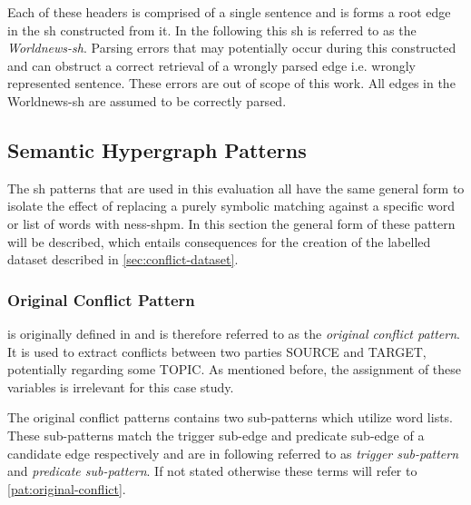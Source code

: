 \documentclass[11pt]{scrreprt}
\let\citef\cite  %
\let\cite\parencite  %
\begin{document}
{Each of these headers is comprised of a single sentence and is forms a root edge in the \gls{sh} constructed from it. In the following this \gls{sh} is referred to as the \textit{Worldnews-\gls{sh}}. Parsing errors that may potentially occur during this constructed and can obstruct a correct retrieval of a wrongly parsed edge i.e. wrongly represented sentence. These errors are out of scope of this work. All edges in the Worldnews-\gls{sh} are assumed to be correctly parsed.

%


\subsection{Semantic Hypergraph Patterns}
\label{sec:sh-patterns}
The \gls{sh} patterns that are used in this evaluation all have the same general form to isolate the effect of replacing a purely symbolic matching against a specific word or list of words with \gls{ness-shpm}. In this section the general form of these pattern will be described, which entails consequences for the creation of the labelled dataset described in \cref{sec:conflict-dataset}. 



\subsubsection{Original Conflict Pattern}
 is originally defined in \citef[p.~22]{menezesSemanticHypergraphs2021} and is therefore referred to as the \textit{original conflict pattern}. It is used to extract conflicts between two parties \textsf{SOURCE} and \textsf{TARGET}, potentially regarding some \textsf{TOPIC}. As mentioned before, the assignment of these variables is irrelevant for this case study.

The original conflict patterns contains two sub-patterns which utilize word lists. These sub-patterns match the trigger sub-edge and predicate sub-edge of a candidate edge respectively and are in following referred to as \textit{trigger sub-pattern} and \textit{predicate sub-pattern}. If not stated otherwise these terms will refer to \cref{pat:original-conflict}. 

}
\end{document}
